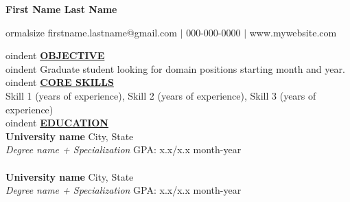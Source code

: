 \documentclass{article}
\begin{document}
\begin{center}
\thispagestyle{empty}
\large \textbf{First Name Last Name \\}

ormalsize firstname.lastname@gmail.com $\mid$ 000-000-0000 $\mid$ www.mywebsite.com    \\
\hrulefill
\end{center}



oindent \textbf{\underline{OBJECTIVE}} \\

oindent Graduate student looking for domain positions starting month and year. \\



oindent \textbf{\underline{CORE SKILLS}} \\
Skill 1 (years of experience), Skill 2 (years of experience), Skill 3 (years of experience) \\


oindent \textbf{\underline{EDUCATION}} \\
\textbf{University name} \hfill City, State \\
\textit{Degree name + Specialization} \hfill GPA: x.x/x.x \hfill month-year \\ \\
\textbf{University name} \hfill City, State \\
\textit{Degree name + Specialization} \hfill GPA: x.x/x.x \hfill month-year \\

% 
%
\end{document}
